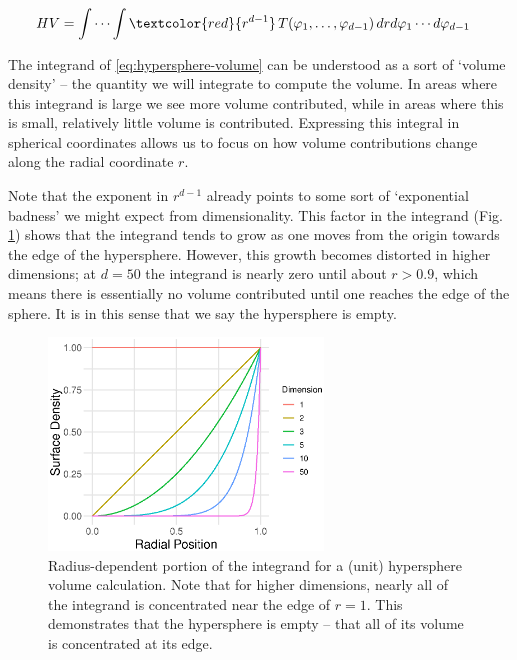 \documentclass{article}
\begin{document}
\begin{equation} \begin{aligned} \label{eq:hypersphere-volume}
    HV &= \int\cdots\int \textcolor{red}{r^{d-1}}\,
         T(\varphi_{1},\dots,\varphi_{d-1})\,
         dr d\varphi_{1}\cdots d\varphi_{d-1}
\end{aligned} \end{equation}

\noindent The integrand of \eqref{eq:hypersphere-volume} can be understood as a
sort of `volume density' -- the quantity we will integrate to compute the
volume. In areas where this integrand is large we see more volume contributed,
while in areas where this is small, relatively little volume is contributed.
Expressing this integral in spherical coordinates allows us to focus on how
volume contributions change along the radial coordinate $r$.

Note that the exponent in $r^{d-1}$ already points to some sort of `exponential
badness' we might expect from dimensionality. This factor in the integrand (Fig.
\ref{fig:hypervolume}) shows that the integrand tends to grow as one moves from
the origin towards the edge of the hypersphere. However, this growth becomes
distorted in higher dimensions; at $d=50$ the integrand is nearly zero until
about $r>0.9$, which means there is essentially no volume contributed until one
reaches the edge of the sphere. It is in this sense that we say the hypersphere
is empty.

\begin{figure}[!ht]
  \centering
  \includegraphics[width=0.65\textwidth]{../../images/surface_density}
  \caption{Radius-dependent portion of the integrand for a (unit) hypersphere
    volume calculation. Note that for higher dimensions, nearly all of the
    integrand is concentrated near the edge of $r=1$. This demonstrates that the
    hypersphere is empty -- that all of its volume is concentrated at its edge.}
  \label{fig:hypervolume}
\end{figure}
\end{document}
